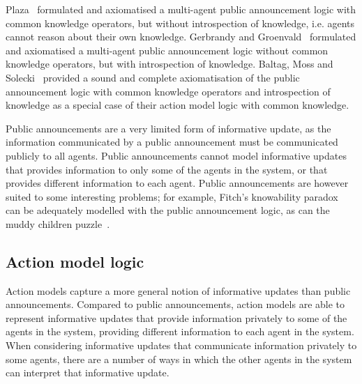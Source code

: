 Plaza~\cite{plaza:1989} formulated and axiomatised a multi-agent public announcement logic with common knowledge operators, but without introspection of knowledge, i.e.  agents cannot reason about their own knowledge. 
Gerbrandy and Groenvald~\cite{gerbrandy:1997} formulated and axiomatised a multi-agent public announcement logic without common knowledge operators, but with introspection of knowledge.
Baltag, Moss and Solecki~\cite{baltag:1998,baltag:2004} provided a sound and complete axiomatisation of the public announcement logic with common knowledge operators and introspection of knowledge as a special case of their action model logic with common knowledge.

Public announcements are a very limited form of informative update, as the information communicated by a public announcement must be communicated publicly to all agents.
Public announcements cannot model informative updates that provides information to only some of the agents in the system, or that provides different information to each agent.
Public announcements are however suited to some interesting problems; for example, Fitch's knowability paradox~\cite{fitch:1963} can be adequately modelled with the public announcement logic, as can the muddy children puzzle~\cite{barwise:1981, vanditmarsch:2007}.


\subsection{Action model logic}

Action models capture a more general notion of informative updates than public announcements.
Compared to public announcements, action models are able to represent informative updates that provide information privately to some of the agents in the system, providing different information to each agent in the system.
When considering informative updates that communicate information privately to some agents, there are a number of ways in which the other agents in the system can interpret that informative update. 

